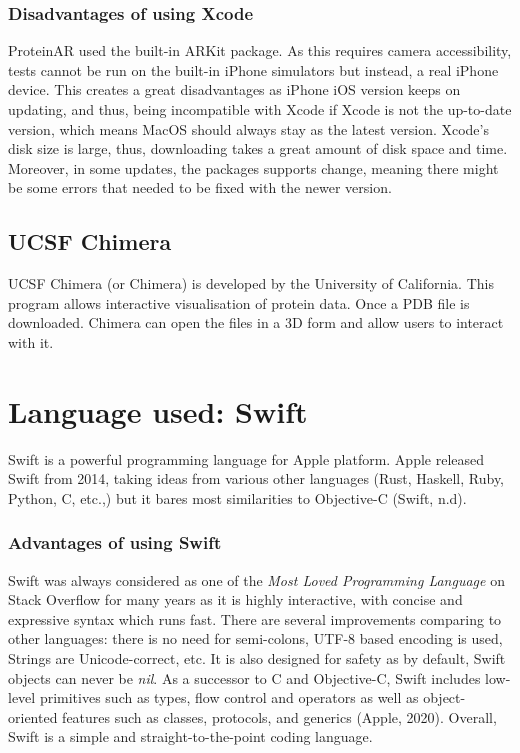 		\subsubsection{Disadvantages of using Xcode}
ProteinAR used the built-in ARKit package. As this requires camera accessibility, tests cannot be run on the built-in iPhone simulators but instead, a real iPhone device. This creates a great disadvantages as iPhone iOS version keeps on updating, and thus, being incompatible with Xcode if Xcode is not the up-to-date version, which means MacOS should always stay as the latest version. Xcode’s disk size is large, thus, downloading takes a great amount of disk space and time. Moreover, in some updates, the packages supports change, meaning there might be some errors that needed to be fixed with the newer version. 

	\subsection{UCSF Chimera}
UCSF Chimera (or Chimera) is developed by the University of California. This program allows interactive visualisation of protein data. Once a PDB file is downloaded. Chimera can open the files in a 3D form and allow users to interact with it. 
	
	\section{Language used: Swift}
Swift is a powerful programming language for Apple platform. Apple released Swift from 2014, taking ideas from various other languages (Rust, Haskell, Ruby, Python, C, etc.,) but it bares most similarities to Objective-C  (Swift, n.d). 
	\subsubsection{Advantages of using Swift}
Swift was always considered as one of the \emph{Most Loved Programming Language} on Stack Overflow for many years as it is highly interactive, with concise and expressive syntax which runs fast. There are several improvements comparing to other languages: there is no need for semi-colons, UTF-8 based encoding is used, Strings are Unicode-correct, etc. It is also designed for safety as by default, Swift objects can never be \emph{nil}. As a successor to C and Objective-C, Swift includes low-level primitives such as types, flow control and operators as well as object-oriented features such as classes, protocols, and generics (Apple, 2020). Overall, Swift is a simple and straight-to-the-point coding language.
